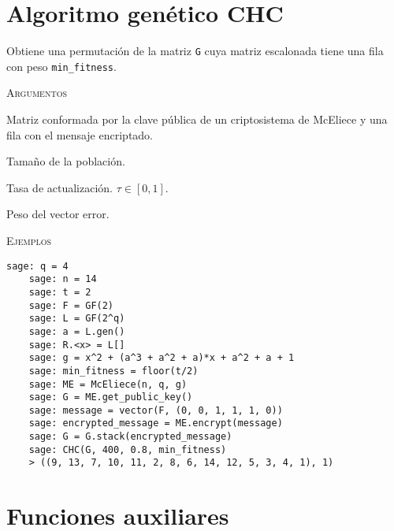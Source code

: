 \section{Algoritmo genético CHC}

\begin{description}[leftmargin=1em, font=\normalfont\ttfamily, style=nextline]
  \item[CHC(G, N, tau, min\_fitness)]

  Obtiene una permutación de la matriz \texttt{G} cuya matriz escalonada tiene una fila con peso \texttt{min\_fitness}.

  \textsc{Argumentos}
  \begin{description}[font=\normalfont\ttfamily]
    \item[G] Matriz conformada por la clave pública de un criptosistema de McEliece y una fila con el mensaje encriptado.
    \item[N] Tamaño de la población.
    \item[tau] Tasa de actualización. $\tau \in [0,1]$.
    \item[min\_fitness] Peso del vector error. 
  \end{description}

  \textsc{Ejemplos}
  \begin{lstlisting}[gobble=4]
    sage: q = 4
    sage: n = 14
    sage: t = 2
    sage: F = GF(2)
    sage: L = GF(2^q)
    sage: a = L.gen()
    sage: R.<x> = L[]
    sage: g = x^2 + (a^3 + a^2 + a)*x + a^2 + a + 1
    sage: min_fitness = floor(t/2)
    sage: ME = McEliece(n, q, g)
    sage: G = ME.get_public_key()
    sage: message = vector(F, (0, 0, 1, 1, 1, 0))
    sage: encrypted_message = ME.encrypt(message)
    sage: G = G.stack(encrypted_message)
    sage: CHC(G, 400, 0.8, min_fitness)
    > ((9, 13, 7, 10, 11, 2, 8, 6, 14, 12, 5, 3, 4, 1), 1)
  \end{lstlisting}
\end{description}

\section{Funciones auxiliares}

